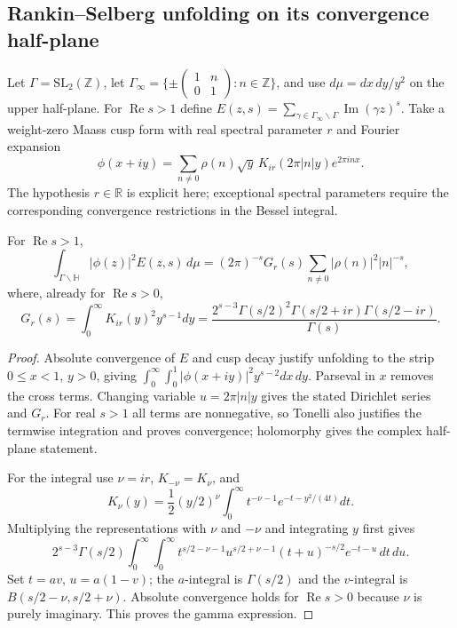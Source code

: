 \subsection{Rankin--Selberg unfolding on its convergence half-plane}
\label{syn-arith:rankin-selberg}
Let $\Gamma=\mathrm{SL}_2(\mathbb Z)$, let
$\Gamma_\infty=\{\pm\left(\begin{smallmatrix}1&n\\0&1\end{smallmatrix}\right):
n\in\mathbb Z\}$, and use $d\mu=dx\,dy/y^2$ on the upper half-plane.
For $\operatorname{Re}s>1$ define
$E(z,s)=\sum_{\gamma\in\Gamma_\infty\backslash\Gamma}
\operatorname{Im}(\gamma z)^s$.
Take a weight-zero Maass cusp form with real spectral parameter $r$ and
Fourier expansion
\[
 \phi(x+iy)=\sum_{n\ne0}\rho(n)\sqrt y\,
               K_{ir}(2\pi|n|y)e^{2\pi inx}.
\]
The hypothesis $r\in\mathbb R$ is explicit here; exceptional spectral
parameters require the corresponding convergence restrictions in the
Bessel integral.

\begin{theorem}
\label{syn-arith:RS}
For $\operatorname{Re}s>1$,
\[
 \int_{\Gamma\backslash\mathbb H}|\phi(z)|^2E(z,s)\,d\mu
 =(2\pi)^{-s}G_r(s)\sum_{n\ne0}|\rho(n)|^2|n|^{-s},
\]
where, already for $\operatorname{Re}s>0$,
\[
 G_r(s)=\int_0^\infty K_{ir}(y)^2y^{s-1}dy
 =\frac{2^{s-3}\Gamma(s/2)^2\Gamma(s/2+ir)\Gamma(s/2-ir)}{\Gamma(s)}.
\]
\end{theorem}
\begin{proof}
Absolute convergence of $E$ and cusp decay justify unfolding to the strip
$0\leq x<1$, $y>0$, giving
$\int_0^\infty\int_0^1|\phi(x+iy)|^2y^{s-2}dx\,dy$.
Parseval in $x$ removes the cross terms.  Changing variable
$u=2\pi|n|y$ gives the stated Dirichlet series and $G_r$.
For real $s>1$ all terms are nonnegative, so Tonelli also justifies the
termwise integration and proves convergence; holomorphy gives the complex
half-plane statement.

For the integral use $\nu=ir$, $K_{-\nu}=K_\nu$, and
\[
 K_\nu(y)=\frac12(y/2)^\nu
       \int_0^\infty t^{-\nu-1}e^{-t-y^2/(4t)}dt.
\]
Multiplying the representations with $\nu$ and $-\nu$ and integrating $y$
first gives
\[
 2^{s-3}\Gamma(s/2)
 \int_0^\infty\int_0^\infty
 t^{s/2-\nu-1}u^{s/2+\nu-1}(t+u)^{-s/2}e^{-t-u}\,dt\,du.
\]
Set $t=av$, $u=a(1-v)$; the $a$-integral is $\Gamma(s/2)$ and the
$v$-integral is $B(s/2-\nu,s/2+\nu)$.
Absolute convergence holds for $\operatorname{Re}s>0$ because $\nu$ is
purely imaginary.  This proves the gamma expression.
\end{proof}

